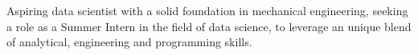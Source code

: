 




Aspiring data scientist with a solid foundation in mechanical engineering, seeking a role as a Summer Intern in the field of data science, to leverage an unique blend of analytical, engineering and programming skills. 

